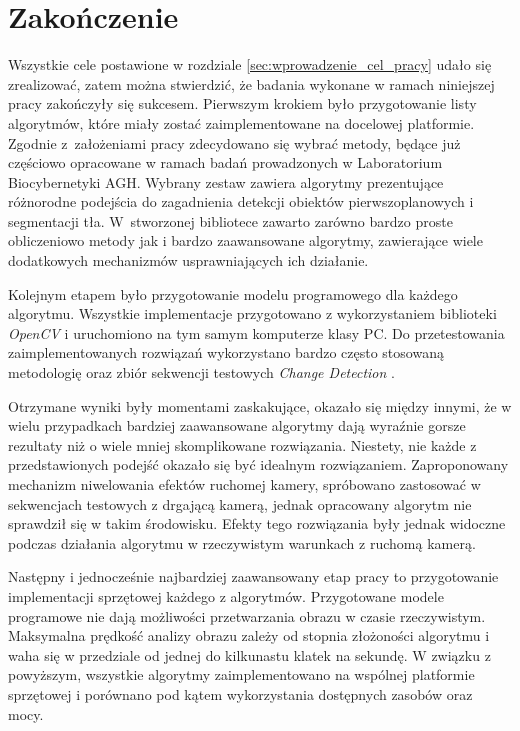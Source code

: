 \chapter{Zakończenie}
\label{cha:zakonczenie}

Wszystkie cele postawione w rozdziale \ref{sec:wprowadzenie_cel_pracy} udało się zrealizować, zatem można stwierdzić, że badania wykonane w ramach niniejszej pracy zakończyły się sukcesem. Pierwszym krokiem było przygotowanie listy algorytmów, które miały zostać zaimplementowane na docelowej platformie. Zgodnie z~założeniami pracy zdecydowano się wybrać metody, będące już częściowo opracowane w ramach badań prowadzonych w Laboratorium Biocybernetyki AGH. Wybrany zestaw zawiera algorytmy prezentujące różnorodne podejścia do zagadnienia detekcji obiektów pierwszoplanowych i segmentacji tła. W~stworzonej bibliotece zawarto zarówno bardzo proste obliczeniowo metody jak i bardzo zaawansowane algorytmy, zawierające wiele dodatkowych mechanizmów usprawniających ich działanie.

Kolejnym etapem było przygotowanie modelu programowego dla każdego algorytmu. Wszystkie implementacje przygotowano z wykorzystaniem biblioteki \textit{OpenCV} i uruchomiono na tym samym komputerze klasy PC. Do przetestowania zaimplementowanych rozwiązań wykorzystano bardzo często stosowaną metodologię \cite{changedetection_15} oraz zbiór sekwencji testowych \textit{Change Detection} \cite{change_detection_web}. 

Otrzymane wyniki były momentami zaskakujące, okazało się między innymi, że w wielu przypadkach bardziej zaawansowane algorytmy dają wyraźnie gorsze rezultaty niż o wiele mniej skomplikowane rozwiązania. 
Niestety, nie każde z przedstawionych podejść okazało się być idealnym rozwiązaniem. 
Zaproponowany mechanizm niwelowania efektów ruchomej kamery, spróbowano zastosować w sekwencjach testowych z drgającą kamerą, jednak opracowany algorytm nie sprawdził się w takim środowisku.
Efekty tego rozwiązania były jednak widoczne podczas działania algorytmu w rzeczywistym warunkach z ruchomą kamerą. 

Następny i jednocześnie najbardziej zaawansowany etap pracy to przygotowanie implementacji sprzętowej każdego z algorytmów. Przygotowane modele programowe nie dają możliwości przetwarzania obrazu w czasie rzeczywistym. Maksymalna prędkość analizy obrazu zależy od stopnia złożoności algorytmu i waha się w przedziale od jednej do kilkunastu klatek na sekundę. W związku z powyższym, wszystkie algorytmy zaimplementowano na wspólnej platformie sprzętowej i porównano pod kątem wykorzystania dostępnych zasobów oraz mocy.

